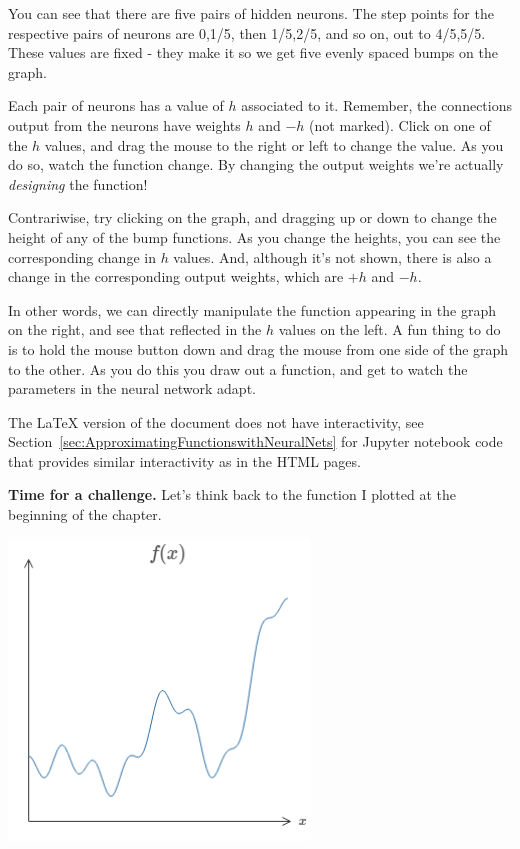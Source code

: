 You can see that there are five pairs of hidden neurons. The step points for the respective pairs of neurons are 0,1/5, then 1/5,2/5, and so on, out to 4/5,5/5. These values are fixed - they make it so we get five evenly spaced bumps on the graph.

Each pair of neurons has a value of $h$ associated to it. Remember, the connections output from the neurons have weights $h$ and $-h$ (not marked). Click on one of the $h$
values, and drag the mouse to the right or left to change the value. As you do so, watch the function change. By changing the output weights we're actually \textit{designing} the function!

Contrariwise, try clicking on the graph, and dragging up or down to change the height of any of the bump functions. As you change the heights, you can see the corresponding change in $h$ values. And, although it's not shown, there is also a change in the corresponding output weights, which are $+h$ and $-h$.

In other words, we can directly manipulate the function appearing in the graph on the right, and see that reflected in the $h$ values on the left. A fun thing to do is to hold the mouse button down and drag the mouse from one side of the graph to the other. As you do this you draw out a function, and get to watch the parameters in the neural network adapt.


The \LaTeX{} version of the document  does not have interactivity, see Section~\ref{sec:ApproximatingFunctionswithNeuralNets} for Jupyter notebook code that provides similar interactivity as in the HTML pages.

\textbf{Time for a challenge.
}
Let's think back to the function I plotted at the beginning of the chapter.

{\centering \includegraphics[width=0.6\textwidth,]{pic/wigglyfn17} \par}

